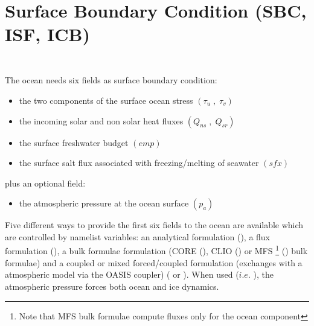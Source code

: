 \documentclass[../tex_main/NEMO_manual]{subfiles}
\begin{document}
\chapter{Surface Boundary Condition (SBC, ISF, ICB) }
\label{chap:SBC}
\minitoc

\newpage
$\ $\newline    %

$\ $\newline    %

The ocean needs six fields as surface boundary condition:
\begin{itemize}
	\item the two components of the surface ocean stress $\left( {\tau _u \;,\;\tau _v} \right)$
	\item the incoming solar and non solar heat fluxes $\left( {Q_{ns} \;,\;Q_{sr} } \right)$
	\item the surface freshwater budget $\left( {\textit{emp}} \right)$
	\item the surface salt flux associated with freezing/melting of seawater $\left( {\textit{sfx}} \right)$
\end{itemize}
plus an optional field:
\begin{itemize}
	\item the atmospheric pressure at the ocean surface $\left( p_a \right)$
\end{itemize}

Five different ways to provide the first six fields to the ocean are available which 
are controlled by namelist  variables: an analytical formulation (), 
a flux formulation (), a bulk formulae formulation (CORE 
(), CLIO () or MFS
\footnote { Note that MFS bulk formulae compute fluxes only for the ocean component}
() bulk formulae) and a coupled or mixed forced/coupled formulation 
(exchanges with a atmospheric model via the OASIS coupler) ( or ). 
When used ($i.e.$ ), the atmospheric pressure forces both ocean and ice dynamics.
\end{document}
